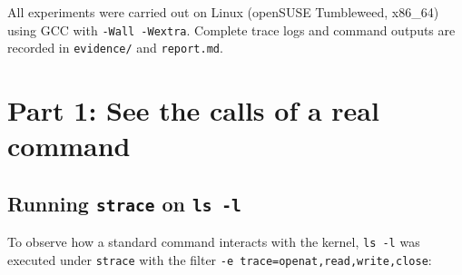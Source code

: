 \documentclass{../latex/utmreport}
\begin{document}
All experiments were carried out on Linux (openSUSE Tumbleweed, x86\_64) using GCC with \texttt{-Wall -Wextra}. Complete trace logs and command outputs are recorded in \texttt{evidence/} and \texttt{report.md}.

\chapter{Part 1: See the calls of a real command}

\section{Running \texttt{strace} on \texttt{ls -l}}

To observe how a standard command interacts with the kernel, \texttt{ls -l} was executed under \texttt{strace} with the filter \texttt{-e trace=openat,read,write,close}:
\end{document}
